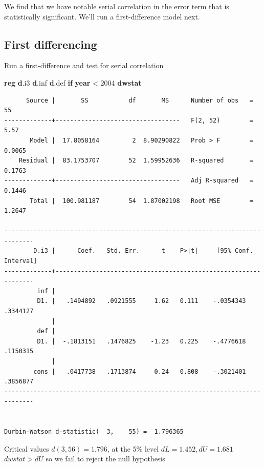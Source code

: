 \documentclass[
]{book}
\newenvironment{Shaded}{\begin{snugshade}}{\end{snugshade}}
\newcommand{\FunctionTok}[1]{\textcolor[rgb]{0.13,0.29,0.53}{\textbf{#1}}}
\newcommand{\KeywordTok}[1]{\textcolor[rgb]{0.13,0.29,0.53}{\textbf{#1}}}
\newcommand{\NormalTok}[1]{#1}
\begin{document}
We find that we have notable serial correlation in the error term that is statistically
significant. We'll run a first-difference model next.

\subsection*{First differencing}\label{first-differencing}

Run a first-difference and test for serial correlation

\begin{Shaded}
\begin{Highlighting}[]
\KeywordTok{reg} \KeywordTok{d}\NormalTok{.i3 }\KeywordTok{d}\NormalTok{.inf }\KeywordTok{d}\NormalTok{.def }\KeywordTok{if} \FunctionTok{year}\NormalTok{ \textless{} 2004}
\KeywordTok{dwstat}
\end{Highlighting}
\end{Shaded}

\begin{verbatim}
      Source |       SS           df       MS      Number of obs   =        55
-------------+----------------------------------   F(2, 52)        =      5.57
       Model |  17.8058164         2  8.90290822   Prob > F        =    0.0065
    Residual |  83.1753707        52  1.59952636   R-squared       =    0.1763
-------------+----------------------------------   Adj R-squared   =    0.1446
       Total |  100.981187        54  1.87002198   Root MSE        =    1.2647

------------------------------------------------------------------------------
        D.i3 |      Coef.   Std. Err.      t    P>|t|     [95% Conf. Interval]
-------------+----------------------------------------------------------------
         inf |
         D1. |   .1494892   .0921555     1.62   0.111    -.0354343    .3344127
             |
         def |
         D1. |  -.1813151   .1476825    -1.23   0.225    -.4776618    .1150315
             |
       _cons |   .0417738   .1713874     0.24   0.808    -.3021401    .3856877
------------------------------------------------------------------------------


Durbin-Watson d-statistic(  3,    55) =  1.796365
\end{verbatim}

Critical values \(d(3,56)=1.796\), at the 5\% level \(dL = 1.452, dU=1.681\)
\(dwstat > dU\) so we fail to reject the null hypothesis
\end{document}
